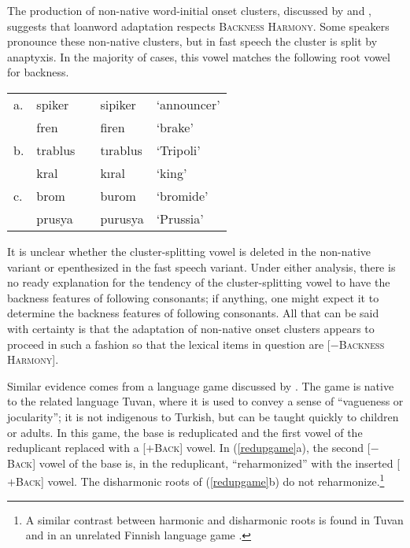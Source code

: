 The production of non-native word-initial onset clusters, discussed by \citet{Clements1982} and \citet{Kaun1999}, suggests that loanword adaptation respects \textsc{Backness Harmony}. 
    Some speakers pronounce these non-native clusters, but in fast speech the cluster is split by anaptyxis. 
    In the majority of cases, this vowel matches the following root vowel for backness.

\begin{example} 
\begin{tabular}{lllll}
a. & {spiker}  & \alt{} & {sipiker}  & `announcer' \\
   & {fren}    & \alt{} & {firen}    & `brake'     \\
b. & {trablus} & \alt{} & {tırablus} & `Tripoli'   \\
   & {kral}    & \alt{} & {kıral}    & `king'      \\
c. & {brom}    & \alt{} & {burom}    & `bromide'   \\
   & {prusya}  & \alt{} & {purusya}  & `Prussia'   \\
\end{tabular}
\label{spiker}
\end{example}

\noindent
It is unclear whether the cluster-splitting vowel is deleted in the non-native variant or epenthesized in the fast speech variant. 
    Under either analysis, there is no ready explanation for the tendency of the cluster-splitting vowel to have the backness features of following consonants; if anything, one might expect it to determine the backness features of following consonants. 
    All that can be said with certainty is that the adaptation of non-native onset clusters appears to proceed in such a fashion so that the lexical items in question are [$-$\textsc{Backness Harmony}].

Similar evidence comes from a language game discussed by \citet{Harrison2001}. 
    The game is native to the related language Tuvan, where it is used to convey a sense of ``vagueness or jocularity''; it is not indigenous to Turkish, but can be taught quickly to children or adults. 
    In this game, the base is reduplicated and the first vowel of the reduplicant replaced with a [$+$\textsc{Back}] vowel. 
    In (\ref{redupgame}a), the second [$-$\textsc{Back}] vowel of the base is, in the reduplicant, ``reharmonized'' with the inserted [$+$\textsc{Back}] vowel. 
    The disharmonic roots of (\ref{redupgame}b) do not reharmonize.\footnote{
    A similar contrast between harmonic and disharmonic roots is found in Tuvan \citep{Harrison2001} and in an unrelated Finnish language game \citep{Campbell1986}.}

